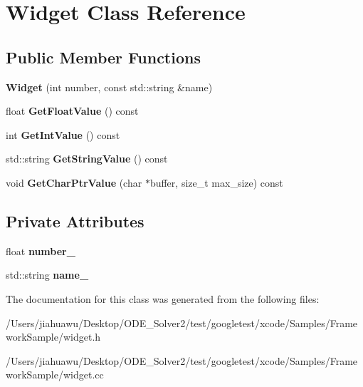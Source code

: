 \hypertarget{class_widget}{}\section{Widget Class Reference}
\label{class_widget}
\subsection*{Public Member Functions}
\begin{DoxyCompactItemize}
\item 
\mbox{\label{class_widget_ab573b75a8a69d29c298af2485fb9cda9}} 
{\bfseries Widget} (int number, const std\+::string \&name)
\item 
\mbox{\label{class_widget_abf639d975e02cabda8132873aca1a333}} 
float {\bfseries Get\+Float\+Value} () const
\item 
\mbox{\label{class_widget_a15e7d0423020a7a98063a749fb97bdd3}} 
int {\bfseries Get\+Int\+Value} () const
\item 
\mbox{\label{class_widget_a7a6e3a7fca3a9373f631c94dc1494d22}} 
std\+::string {\bfseries Get\+String\+Value} () const
\item 
\mbox{\label{class_widget_a50791a556979f22f5593383143c7f815}} 
void {\bfseries Get\+Char\+Ptr\+Value} (char $\ast$buffer, size\+\_\+t max\+\_\+size) const
\end{DoxyCompactItemize}
\subsection*{Private Attributes}
\begin{DoxyCompactItemize}
\item 
\mbox{\label{class_widget_a27a2b3fd66372d5731fa9a6bcaab755b}} 
float {\bfseries number\+\_\+}
\item 
\mbox{\label{class_widget_a1d2f74810f3f912270a681e0671a7a55}} 
std\+::string {\bfseries name\+\_\+}
\end{DoxyCompactItemize}


The documentation for this class was generated from the following files\+:\begin{DoxyCompactItemize}
\item 
/\+Users/jiahuawu/\+Desktop/\+O\+D\+E\+\_\+\+Solver2/test/googletest/xcode/\+Samples/\+Framework\+Sample/widget.\+h\item 
/\+Users/jiahuawu/\+Desktop/\+O\+D\+E\+\_\+\+Solver2/test/googletest/xcode/\+Samples/\+Framework\+Sample/widget.\+cc\end{DoxyCompactItemize}
